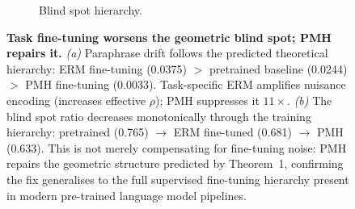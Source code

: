 \begin{figure}[t]
\begin{subfigure}[b]{0.46\textwidth}
\caption{Blind spot hierarchy.}
\end{subfigure}
\caption{\textbf{Task fine-tuning worsens the geometric blind spot; PMH repairs it.}
\emph{(a)} Paraphrase drift follows the predicted theoretical hierarchy:
ERM fine-tuning (0.0375) $>$ pretrained baseline (0.0244) $>$ PMH fine-tuning (0.0033).
Task-specific ERM amplifies nuisance encoding (increases effective $\rho$);
PMH suppresses it $11\times$.
\emph{(b)} The blind spot ratio decreases monotonically through the training hierarchy: pretrained (0.765) $\to$ ERM fine-tuned (0.681) $\to$ PMH (0.633).
This is not merely compensating for fine-tuning noise: PMH repairs the geometric structure
predicted by Theorem~1, confirming the fix generalises to the full supervised fine-tuning
hierarchy present in modern pre-trained language model pipelines.}
\label{fig:A10}
\end{figure}
